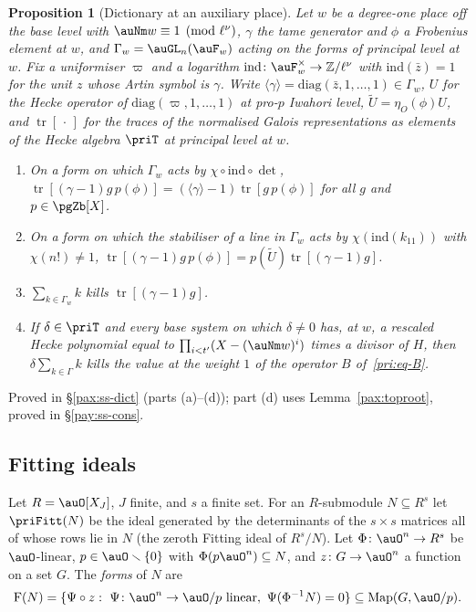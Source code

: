 \documentclass[10pt]{amsart}
\newtheorem{proposition}[theorem]{Proposition}
\theoremstyle{definition}
\theoremstyle{remark}
\newcommand{\Z}{\mathbb Z}
\begin{document}
\begin{proposition}[Dictionary at an auxiliary place]\label{pri:dict}
Let $w$ be a degree-one place off the base level with $\auNm w\equiv1\pmod{\ell^\nu}$, $\gamma$ the
tame generator and $\phi$ a Frobenius element at $w$, and $\Gamma_w=\auGL_n(\auF_w)$ acting on the
forms of principal level at $w$. Fix a uniformiser $\varpi$ and a logarithm $\mathrm{ind}\colon
\auF_w^\times\to\Z/\ell^\nu$ with $\mathrm{ind}(\bar z)=1$ for the unit $z$ whose Artin symbol is
$\gamma$. Write $\langle\gamma\rangle=\mathrm{diag}(\bar z,1,\dots,1)\in\Gamma_w$, $U$ for the
Hecke operator of $\mathrm{diag}(\varpi,1,\dots,1)$ at pro-$p$ Iwahori level, $\tilde U=
\eta_O(\phi)U$, and $\operatorname{tr}[\,\cdot\,]$ for the traces of the normalised Galois
representations as elements of the Hecke algebra $\priT$ at principal level at $w$.
\begin{enumerate}
\item[(a)] On a form on which $\Gamma_w$ acts by $\chi\circ\mathrm{ind}\circ\det$,
$\operatorname{tr}[(\gamma-1)g\,p(\phi)]=(\langle\gamma\rangle-1)\operatorname{tr}[g\,p(\phi)]$ for
all $g$ and $p\in\pgZb[X]$.
\item[(b)] On a form on which the stabiliser of a line in $\Gamma_w$ acts by $\chi(\mathrm{ind}(
k_{11}))$ with $\chi(n!)\ne1$, $\operatorname{tr}[(\gamma-1)g\,p(\phi)]=p(\tilde U)
\operatorname{tr}[(\gamma-1)g]$.
\item[(c)] $\sum_{k\in\Gamma_w}k$ kills $\operatorname{tr}[(\gamma-1)g]$.
\item[(d)] If $\delta\in\priT$ and every base system on which $\delta\ne0$ has, at $w$, a rescaled
Hecke polynomial equal to $\prod_{i<t'}(X-(\auNm w)^i)$ times a divisor of $H$, then $\delta
\sum_{k\in\Gamma}k$ kills the value at the weight $1$ of the operator $B$ of~\eqref{pri:eq-B}.
\end{enumerate}
\end{proposition}
\noindent Proved in \S\ref{pax:ss-dict} (parts (a)--(d)); part (d) uses Lemma~\ref{pax:toproot},
proved in \S\ref{pay:ss-cons}.\par\smallskip

\subsection{Fitting ideals}\label{pri:ss-fitting}

Let $R=\auO[X_J]$, $J$ finite, and $s$ a finite set. For an $R$-submodule $N\subseteq R^s$ let
$\priFitt(N)$ be the ideal generated by the determinants of the $s\times s$ matrices all of whose
rows lie in $N$ (the zeroth Fitting ideal of $R^s/N$). Let $\Phi\colon\auO^n\to R^s$ be
$\auO$-linear, $p\in\auO\smallsetminus\{0\}$ with $\Phi(p\auO^n)\subseteq N$, and $z\colon G\to\auO^n$
a function on a set $G$. The \emph{forms} of $N$ are
\[
\mathrm{F}(N)=\{\Psi\circ z:\ \Psi\colon\auO^n\to\auO/p\ \text{linear},\ \Psi(\Phi^{-1}N)=0\}
\subseteq\operatorname{Map}(G,\auO/p).
\]
\end{document}
